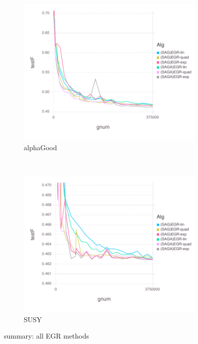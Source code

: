 \documentclass[11pt]{article}
\begin{document}
   \begin{figure}[H]
       \centering
       \begin{subfigure}[b]{0.45\textwidth}
           \includegraphics[width=\textwidth]{Figures/alphaGoodBLtrueFfFinal-1.pdf}
           \caption{alphaGood}
       \end{subfigure}
       ~ %
         \begin{subfigure}[b]{0.45\textwidth}
           \includegraphics[width=\textwidth]{Figures/SUSYBLtrueFfFinal-1.pdf}
             \caption{SUSY}
         \end{subfigure}
       \caption{summary: all EGR methods}\label{fig:alphaGoodsummary}
   \end{figure}
   
\end{document}
